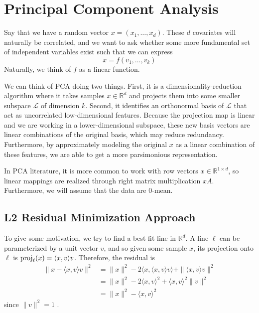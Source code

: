 \section{Principal Component Analysis}  

  Say that we have a random vector $x = (x_1, \ldots, x_d)$. These $d$ covariates will naturally be correlated, and we want to ask whether some more fundamental set of independent variables exist \cite{1933hotelling} such that we can express
  \begin{equation}
    x = f(v_1, \ldots, v_k)
  \end{equation} 
  Naturally, we think of $f$ as a linear function. 

  We can think of PCA doing two things. First, it is a dimensionality-reduction algorithm where it takes samples $x \in \mathbb{R}^d$ and projects them into some smaller subspace $\mathcal{L}$ of dimension $k$. Second, it identifies an orthonormal basis of $\mathcal{L}$ that act as uncorrelated low-dimensional features. Because the projection map is linear and we are working in a lower-dimensional subspace, these new basis vectors are linear combinations of the original basis, which may reduce redundancy. Furthermore, by approximately modeling the original $x$ as a linear combination of these features, we are able to get a more parsimonious representation. 

  In PCA literature, it is more common to work with row vectors $x \in \mathbb{R}^{1 \times d}$, so linear mappings are realized through right matrix multiplication $x A$. Furthermore, we will assume that the data are $0$-mean. 

\subsection{L2 Residual Minimization Approach} 

  To give some motivation, we try to find a best fit line in $\mathbb{R}^d$. A line $\ell$ can be parameterized by a unit vector $v$, and so given some sample $x$, its projection onto $\ell$ is $\operatorname{proj}_{\ell} (x) = \langle x, v\rangle v$. Therefore, the residual is 
  \begin{align}
    \| x - \langle x, v \rangle v \|^2 & = \|x\|^2 - 2 \langle x, \langle x, v \rangle v \rangle + \| \langle x, v \rangle v \|^2 \\ 
                                       & = \|x\|^2 - 2 \langle x, v \rangle^2 + \langle x, v \rangle^2 \|v\|^2 \\ 
                                       & = \|x\|^2 - \langle x, v \rangle^2
  \end{align}
  since $\|v\|^2 = 1$ \cite{2019shalizi}. 

